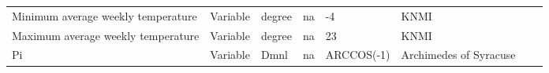 \begin{landscape}
\begin{longtable}[c]{m{10em}lllm{15em}lll}
Minimum average weekly temperature            & Variable & degree                   & na                        & -4                                                                                                                                                                                                                                                                                       & KNMI                                                                                                                                                                                         &                                                                                                                                                                                                                                       \\
Maximum average weekly temperature            & Variable & degree                   & na                        & 23                                                                                                                                                                                                                                                                                       & KNMI                                                                                                                                                                                         &                                                                                                                                                                                                                                       \\
Pi                                            & Variable & Dmnl                     & na                        & ARCCOS(-1)                                                                                                                                                                                                                                                                               & Archimedes of Syracuse                                                                                                                                                                       &                                                                                                                                                                                                                                       \\

\end{longtable}
\end{landscape}
